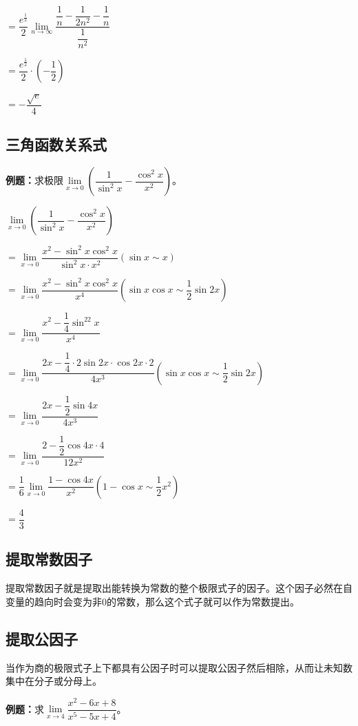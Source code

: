 \documentclass[UTF8, 12pt]{ctexart}
\begin{document}
$=\dfrac{e^{\frac{1}{2}}}{2}\lim\limits_{n\to\infty}\dfrac{\dfrac{1}{n}-\dfrac{1}{2n^2}-\dfrac{1}{n}}{\dfrac{1}{n^2}}$

$=\dfrac{e^{\frac{1}{2}}}{2}\cdot\left(-\dfrac{1}{2}\right)$

$=-\dfrac{\sqrt{e}}{4}$

\subsection{三角函数关系式}

\textbf{例题：}求极限$\lim\limits_{x\to 0}\left(\dfrac{1}{\sin^2x}-\dfrac{\cos^2x}{x^2}\right)$。\medskip

$\lim\limits_{x\to 0}\left(\dfrac{1}{\sin^2x}-\dfrac{\cos^2x}{x^2}\right)$ \medskip

$= \lim\limits_{x\to 0}\dfrac{x^2-\sin^2x\cos^2x}{\sin^2x\cdot x^2} (\sin x\sim x)$ \medskip

$= \lim\limits_{x\to 0}\dfrac{x^2-\sin^2x\cos^2x}{x^4} (\sin x\cos x\sim\dfrac{1}{2}\sin 2x)$ \medskip

$= \lim\limits_{x\to 0}\dfrac{x^2-\dfrac{1}{4}\sin^22x}{x^4}$ \medskip

$= \lim\limits_{x\to 0}\dfrac{2x-\dfrac{1}{4}\cdot 2\sin 2x\cdot\cos 2x\cdot 2}{4x^3} (\sin x\cos x\sim\dfrac{1}{2}\sin 2x)$ \medskip

$= \lim\limits_{x\to 0}\dfrac{2x-\dfrac{1}{2}\sin 4x}{4x^3}$ \medskip

$= \lim\limits_{x\to 0}\dfrac{2-\dfrac{1}{2}\cos 4x\cdot 4}{12x^2}$ \medskip

$= \dfrac{1}{6}\lim\limits_{x\to 0}\dfrac{1-\cos 4x}{x^2} (1-\cos x\sim \dfrac{1}{2}x^2)$ \medskip

$= \dfrac{4}{3}$

\subsection{提取常数因子}

提取常数因子就是提取出能转换为常数的整个极限式子的因子。这个因子必然在自变量的趋向时会变为非0的常数，那么这个式子就可以作为常数提出。

\subsection{提取公因子}

当作为商的极限式子上下都具有公因子时可以提取公因子然后相除，从而让未知数集中在分子或分母上。

\textbf{例题：}求$\lim\limits_{x\to 4}\dfrac{x^2-6x+8}{x^5-5x+4}$。
\end{document}
